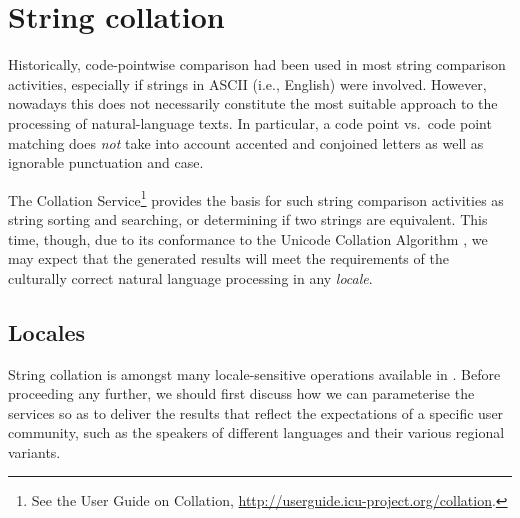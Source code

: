 \documentclass[nojss]{jss}
\begin{document}


\section{String collation}\label{Sec:collator}



Historically, code-pointwise comparison had been used in most string comparison
activities, especially if strings in ASCII (i.e., English) were
involved. However, nowadays %
this does not necessarily constitute the most suitable
approach to the processing of natural-language texts.
In particular, a code point vs.~code point matching
does \textit{not} take into account
accented and conjoined letters as well as ignorable punctuation and case.



The  Collation Service\footnote{See the  User Guide on {Collation},
\url{http://userguide.icu-project.org/collation}.}
provides the basis for such string comparison activities as
string sorting and searching, or determining if two strings are equivalent.
This time, though, due to its conformance to
the Unicode Collation Algorithm \citep{uts10:collation},
we may expect that the generated results
will meet the requirements of the culturally correct
natural language processing in any \textit{locale}.





\subsection{Locales}

String collation is amongst many locale-sensitive operations  available
in . Before proceeding any further, we should
first discuss how we can parameterise the  services
so as to deliver the results that reflect the expectations
of a specific user community, such as the speakers of different languages
and their various regional variants.
\end{document}
